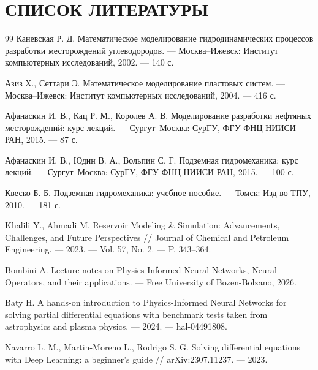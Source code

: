 \documentclass[12pt, a4paper]{article}
\begin{document}
\newpage
\section*{СПИСОК ЛИТЕРАТУРЫ}

\begingroup
\renewcommand{\refname}{}

\begin{thebibliography}{99}
 Каневская Р. Д. Математическое моделирование гидродинамических процессов разработки месторождений углеводородов. --- Москва--Ижевск: Институт компьютерных исследований, 2002. --- 140 с.

 Азиз Х., Сеттари Э. Математическое моделирование пластовых систем. --- Москва--Ижевск: Институт компьютерных исследований, 2004. --- 416 с.

 Афанаскин И. В., Кац Р. М., Королев А. В. Моделирование разработки нефтяных месторождений: курс лекций. --- Сургут--Москва: СурГУ, ФГУ ФНЦ НИИСИ РАН, 2015. --- 87 с.

 Афанаскин И. В., Юдин В. А., Вольпин С. Г. Подземная гидромеханика: курс лекций. --- Сургут--Москва: СурГУ, ФГУ ФНЦ НИИСИ РАН, 2015. --- 100 с.

 Квеско Б. Б. Подземная гидромеханика: учебное пособие. --- Томск: Изд-во ТПУ, 2010. --- 181 с.

 Khalili Y., Ahmadi M. Reservoir Modeling \& Simulation: Advancements, Challenges, and Future Perspectives // Journal of Chemical and Petroleum Engineering. --- 2023. --- Vol. 57, No. 2. --- P. 343--364.

 Bombini A. Lecture notes on Physics Informed Neural Networks, Neural Operators, and their applications. --- Free University of Bozen-Bolzano, 2026.

 Baty H. A hands-on introduction to Physics-Informed Neural Networks for solving partial differential equations with benchmark tests taken from astrophysics and plasma physics. --- 2024. --- hal-04491808.

 Navarro L. M., Martin-Moreno L., Rodrigo S. G. Solving differential equations with Deep Learning: a beginner's guide // arXiv:2307.11237. --- 2023.



\end{thebibliography}
\end{document}
